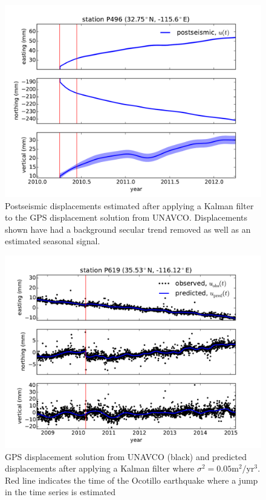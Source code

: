 \documentclass[12pt]{article}
\begin{document}
\begin{figure}
\includegraphics[scale=0.6]{Figures/figure_2}
\centering
\caption{Postseismic displacements estimated after applying a Kalman filter to the GPS displacement solution from UNAVCO.  Displacements shown have had a background secular trend removed as well as an estimated seasonal signal.} 
\label{P496PS}
\end{figure}

\begin{figure}
\includegraphics[scale=0.6]{Figures/figure_3}
\centering
\caption{GPS displacement solution from UNAVCO (black) and predicted displacements after applying a Kalman filter where $\sigma^2=0.05 \mathrm{m}^2/\mathrm{yr}^3$. Red line indicates the time of the Ocotillo earthquake where a jump in the time series is estimated}
\label{P619Fit}
\end{figure}
\end{document}
